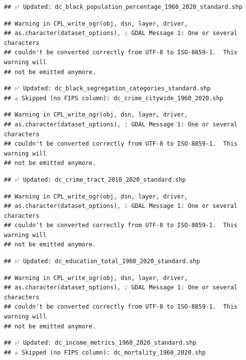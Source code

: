 \documentclass[
]{article}
\begin{document}
\begin{verbatim}
## ✅ Updated: dc_black_population_percentage_1960_2020_standard.shp
\end{verbatim}

\begin{verbatim}
## Warning in CPL_write_ogr(obj, dsn, layer, driver,
## as.character(dataset_options), : GDAL Message 1: One or several characters
## couldn't be converted correctly from UTF-8 to ISO-8859-1.  This warning will
## not be emitted anymore.
\end{verbatim}

\begin{verbatim}
## ✅ Updated: dc_black_segregation_categories_standard.shp
## ⚠️ Skipped (no FIPS column): dc_crime_citywide_1960_2020.shp
\end{verbatim}

\begin{verbatim}
## Warning in CPL_write_ogr(obj, dsn, layer, driver,
## as.character(dataset_options), : GDAL Message 1: One or several characters
## couldn't be converted correctly from UTF-8 to ISO-8859-1.  This warning will
## not be emitted anymore.
\end{verbatim}

\begin{verbatim}
## ✅ Updated: dc_crime_tract_2010_2020_standard.shp
\end{verbatim}

\begin{verbatim}
## Warning in CPL_write_ogr(obj, dsn, layer, driver,
## as.character(dataset_options), : GDAL Message 1: One or several characters
## couldn't be converted correctly from UTF-8 to ISO-8859-1.  This warning will
## not be emitted anymore.
\end{verbatim}

\begin{verbatim}
## ✅ Updated: dc_education_total_1960_2020_standard.shp
\end{verbatim}

\begin{verbatim}
## Warning in CPL_write_ogr(obj, dsn, layer, driver,
## as.character(dataset_options), : GDAL Message 1: One or several characters
## couldn't be converted correctly from UTF-8 to ISO-8859-1.  This warning will
## not be emitted anymore.
\end{verbatim}

\begin{verbatim}
## ✅ Updated: dc_income_metrics_1960_2020_standard.shp
## ⚠️ Skipped (no FIPS column): dc_mortality_1960_2020.shp
\end{verbatim}
\end{document}
